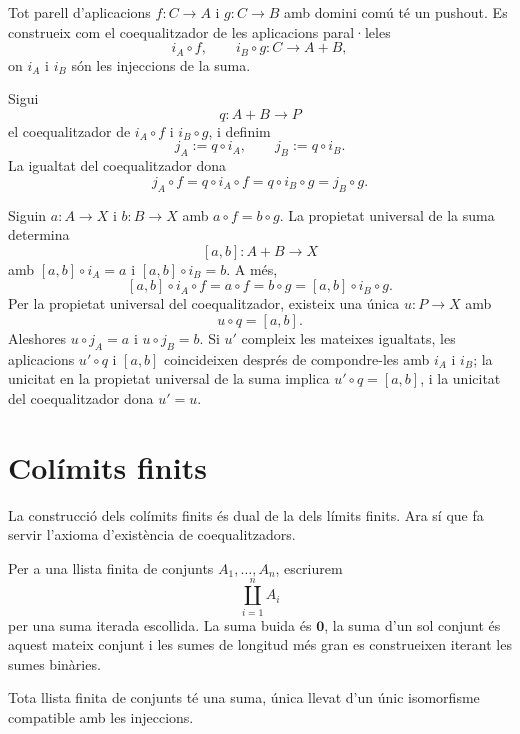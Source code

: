\begin{teorema}\label{teo:pushout-construccio}
Tot parell d'aplicacions \(f:C\to A\) i \(g:C\to B\) amb domini comú té un pushout. Es construeix com el coequalitzador de les aplicacions paral·leles
\[
i_A\circ f,
\qquad
i_B\circ g:C\to A+B,
\]
on \(i_A\) i \(i_B\) són les injeccions de la suma.
\end{teorema}

\begin{prova}
Sigui
\[
q:A+B\to P
\]
el coequalitzador de \(i_A\circ f\) i \(i_B\circ g\), i definim
\[
j_A:=q\circ i_A,
\qquad
j_B:=q\circ i_B.
\]
La igualtat del coequalitzador dona
\[
j_A\circ f=q\circ i_A\circ f
=q\circ i_B\circ g
=j_B\circ g.
\]

Siguin \(a:A\to X\) i \(b:B\to X\) amb \(a\circ f=b\circ g\). La propietat universal de la suma determina
\[
[a,b]:A+B\to X
\]
amb \([a,b]\circ i_A=a\) i \([a,b]\circ i_B=b\). A més,
\[
[a,b]\circ i_A\circ f
=a\circ f
=b\circ g
=[a,b]\circ i_B\circ g.
\]
Per la propietat universal del coequalitzador, existeix una única \(u:P\to X\) amb
\[
u\circ q=[a,b].
\]
Aleshores \(u\circ j_A=a\) i \(u\circ j_B=b\). Si \(u'\) compleix les mateixes igualtats, les aplicacions \(u'\circ q\) i \([a,b]\) coincideixen després de compondre-les amb \(i_A\) i \(i_B\); la unicitat en la propietat universal de la suma implica \(u'\circ q=[a,b]\), i la unicitat del coequalitzador dona \(u'=u\).
\end{prova}

\section{Colímits finits}\label{sec:colimits-finits}

La construcció dels colímits finits és dual de la dels límits finits. Ara sí que fa servir l'axioma d'existència de coequalitzadors.

\begin{notacio}\label{not:sumes-finits}
Per a una llista finita de conjunts \(A_1,\ldots,A_n\), escriurem
\[
\coprod_{i=1}^{n}A_i
\]
per una suma iterada escollida. La suma buida és \(\mathbf0\), la suma d'un sol conjunt és aquest mateix conjunt i les sumes de longitud més gran es construeixen iterant les sumes binàries.
\end{notacio}

\begin{proposicio}\label{prop:sumes-finits}
Tota llista finita de conjunts té una suma, única llevat d'un únic isomorfisme compatible amb les injeccions.
\end{proposicio}

